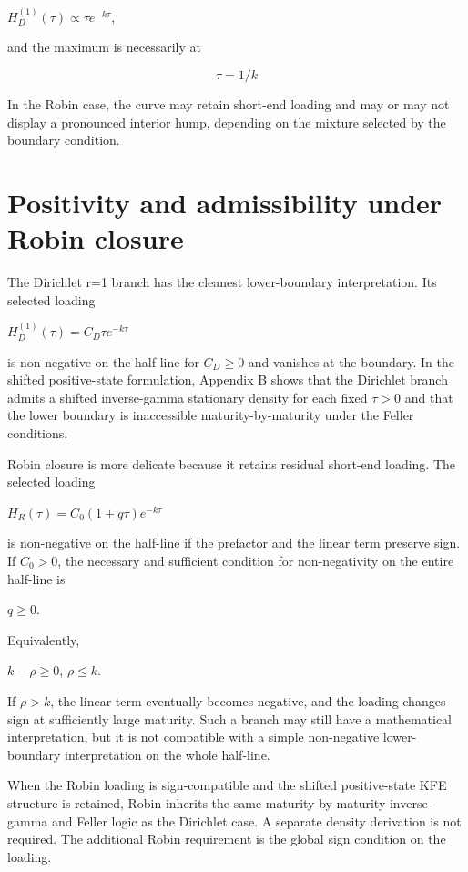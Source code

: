 \documentclass[11pt,oneside]{book}
\begin{document}
$H_D^{(1)}(\tau)\propto\tau e^{-k\tau}$,

and the maximum is necessarily at

\[
\tau=1/k
\]

In the Robin case, the curve may retain short-end loading and may or may
not display a pronounced interior hump, depending on the mixture
selected by the boundary condition.

\section{Positivity and admissibility under Robin
closure}\label{positivity-and-admissibility-under-robin-closure}

The Dirichlet r=1 branch has the cleanest lower-boundary interpretation.
Its selected loading

$H_D^{(1)}(\tau)=C_D\tau e^{-k\tau}$

is non-negative on the half-line for $C_D\geq0$ and vanishes at the
boundary. In the shifted positive-state formulation, Appendix B shows
that the Dirichlet branch admits a shifted inverse-gamma stationary
density for each fixed $\tau>0$ and that the lower boundary is
inaccessible maturity-by-maturity under the Feller conditions.

Robin closure is more delicate because it retains residual short-end
loading. The selected loading

$H_R(\tau)=C_0(1+q\tau)e^{-k\tau}$

is non-negative on the half-line if the prefactor and the linear term
preserve sign. If $C_0>0$, the necessary and sufficient
condition for non-negativity on the entire half-line is

$q\geq0$.

Equivalently,

$k-\rho\geq0$, $\rho\leq k$.

If $\rho>k$, the linear term eventually becomes negative, and the
loading changes sign at sufficiently large maturity. Such a branch may
still have a mathematical interpretation, but it is not compatible with
a simple non-negative lower-boundary interpretation on the whole
half-line.

When the Robin loading is sign-compatible and the shifted positive-state
KFE structure is retained, Robin inherits the same maturity-by-maturity
inverse-gamma and Feller logic as the Dirichlet case. A separate density
derivation is not required. The additional Robin requirement is the
global sign condition on the loading.
\end{document}
